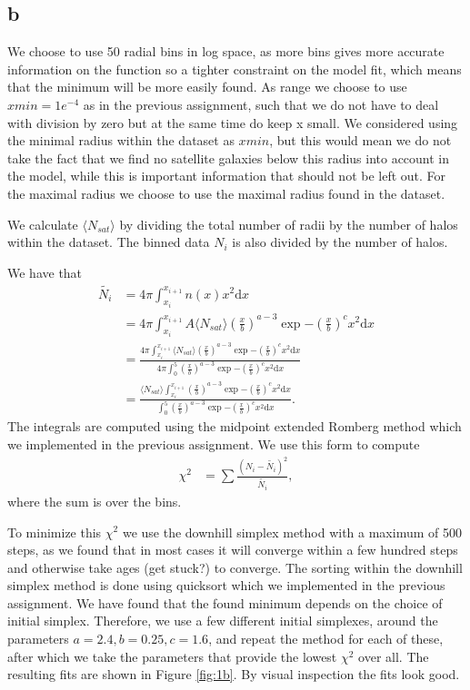 \subsection{b}

We choose to use 50 radial bins in log space, as more bins gives more accurate information on the function so a tighter constraint on the model fit, 
which means that the minimum will be more easily found.
As range we choose to use $xmin=1e^{-4}$ as in the previous assignment, such that we do not have to deal with division by zero but at the same time do keep
x small. We considered using the minimal radius within the dataset as $xmin$, but this would mean we do not take the fact that we find no satellite galaxies below
this radius into account in the model, while this is important information that should not be left out. For the maximal radius we choose to use the maximal radius found in the dataset.

We calculate $\langle N_{sat}\rangle$ by dividing the total number of radii by the number of halos within the dataset. 
The binned data $N_i$ is also divided by the number of halos.

We have that 
\begin{align*}
    \tilde{N_i} 
    &= 4\pi\int_{x_i}^{x_{i+1}} n(x)x^2 \text{d}x\\
    &= 4\pi\int_{x_i}^{x_{i+1}} A \langle N_{sat} \rangle (\frac{x}{b})^{a-3}\exp{-(\frac{x}{b})^c}x^2 \text{d}x\\
    &= \frac{4\pi\int_{x_i}^{x_{i+1}} \langle N_{sat} \rangle (\frac{x}{b})^{a-3}\exp{-(\frac{x}{b})^c}x^2 \text{d}x}{4\pi \int_{0}^{5} (\frac{x}{b})^{a-3}\exp{-(\frac{x}{b})^c}x^2 \text{d}x}\\
    &= \frac{\langle N_{sat} \rangle\int_{x_i}^{x_{i+1}} (\frac{x}{b})^{a-3}\exp{-(\frac{x}{b})^c}x^2 \text{d}x}{\int_{0}^{5} (\frac{x}{b})^{a-3}\exp{-(\frac{x}{b})^c}x^2 \text{d}x}.
\end{align*}
The integrals are computed using the midpoint extended Romberg method which we implemented in the previous assignment. We use this form to compute
\begin{align*}
    \chi^2 &= \sum \frac{(N_i-\tilde{N_i})^2}{\tilde{N_i}},
\end{align*}
where the sum is over the bins.

To minimize this $\chi^2$ we use the downhill simplex method with a maximum of 500 steps, as we found that in most cases it will converge within a few hundred steps and otherwise
take ages (get stuck?) to converge. The sorting within the downhill simplex method is done using quicksort which we implemented in the previous assignment.
We have found that the found minimum depends on the choice of initial simplex.
Therefore, we use a few different initial simplexes, around the parameters $a=2.4, b=0.25, c=1.6$, and repeat the method
for each of these, after which we take the parameters that provide the lowest $\chi^2$ over all.
The resulting fits are shown in Figure \ref{fig:1b}. By visual inspection the fits look good.

